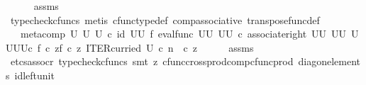 \begin{isabellebody}
\ \ \ \ \isamarkupfalse%
\ assms\ \isamarkupfalse%
\ {\isacharparenleft}{\kern0pt}typecheck{\isacharunderscore}{\kern0pt}cfuncs{\isacharcomma}{\kern0pt}\ metis\ cfunc{\isacharunderscore}{\kern0pt}type{\isacharunderscore}{\kern0pt}def\ comp{\isacharunderscore}{\kern0pt}associative\ transpose{\isacharunderscore}{\kern0pt}func{\isacharunderscore}{\kern0pt}def{\isacharparenright}{\kern0pt}\isanewline
\ \ \isamarkupfalse%
\ \isamarkupfalse%
\ {\isachardoublequoteopen}{\isachardot}{\kern0pt}{\isachardot}{\kern0pt}{\isachardot}{\kern0pt}\ {\isacharequal}{\kern0pt}\ {\isacharparenleft}{\kern0pt}meta{\isacharunderscore}{\kern0pt}comp\ U\ U\ U\ {\isasymcirc}\isactrlsub c\ {\isacharparenleft}{\kern0pt}id\ {\isacharparenleft}{\kern0pt}U\isactrlbsup U\isactrlesup {\isacharparenright}{\kern0pt}\ {\isasymtimes}\isactrlsub f\ eval{\isacharunderscore}{\kern0pt}func\ {\isacharparenleft}{\kern0pt}U\isactrlbsup U\isactrlesup {\isacharparenright}{\kern0pt}\ {\isacharparenleft}{\kern0pt}U\isactrlbsup U\isactrlesup {\isacharparenright}{\kern0pt}{\isacharparenright}{\kern0pt}\ {\isasymcirc}\isactrlsub c\ {\isacharparenleft}{\kern0pt}associate{\isacharunderscore}{\kern0pt}right\ {\isacharparenleft}{\kern0pt}U\isactrlbsup U\isactrlesup {\isacharparenright}{\kern0pt}\ {\isacharparenleft}{\kern0pt}U\isactrlbsup U\isactrlesup {\isacharparenright}{\kern0pt}\ {\isacharparenleft}{\kern0pt}{\isacharparenleft}{\kern0pt}U\isactrlbsup U\isactrlesup {\isacharparenright}{\kern0pt}\isactrlbsup U\isactrlbsup U\isactrlesup \isactrlesup {\isacharparenright}{\kern0pt}{\isacharparenright}{\kern0pt}{\isacharparenright}{\kern0pt}{\isasymcirc}\isactrlsub c\ {\isasymlangle}{\isasymlangle}f\ {\isasymcirc}\isactrlsub c\ z{\isacharcomma}{\kern0pt}f\ {\isasymcirc}\isactrlsub c\ z{\isasymrangle}{\isacharcomma}{\kern0pt}\ ITER{\isacharunderscore}{\kern0pt}curried\ U\ {\isasymcirc}\isactrlsub c\ {\isacharparenleft}{\kern0pt}n\ \ {\isasymcirc}\isactrlsub c\ z{\isacharparenright}{\kern0pt}{\isasymrangle}{\isachardoublequoteclose}\isanewline
\ \ \ \ \isamarkupfalse%
\ assms\ \isamarkupfalse%
\ {\isacharparenleft}{\kern0pt}etcs{\isacharunderscore}{\kern0pt}assocr{\isacharcomma}{\kern0pt}\ typecheck{\isacharunderscore}{\kern0pt}cfuncs{\isacharcomma}{\kern0pt}\ smt\ {\isacharparenleft}{\kern0pt}z{}{\isacharparenright}{\kern0pt}\ cfunc{\isacharunderscore}{\kern0pt}cross{\isacharunderscore}{\kern0pt}prod{\isacharunderscore}{\kern0pt}comp{\isacharunderscore}{\kern0pt}cfunc{\isacharunderscore}{\kern0pt}prod\ diag{\isacharunderscore}{\kern0pt}on{\isacharunderscore}{\kern0pt}elements\ id{\isacharunderscore}{\kern0pt}left{\isacharunderscore}{\kern0pt}unit{}{\isacharparenright}{\kern0pt}\isanewline

\end{isabellebody}

